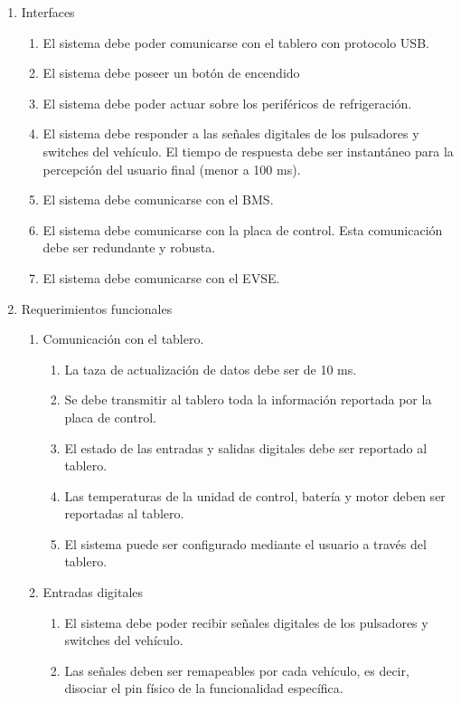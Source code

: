 \documentclass[
11pt, %
codirector, %
]{charter}
\begin{document}
\begin{enumerate}
	\item Interfaces
	      \begin{enumerate}
		      \item El sistema debe poder comunicarse con el tablero con protocolo USB.
		      \item El sistema debe poseer un botón de encendido
		      \item El sistema debe poder actuar sobre los periféricos de refrigeración.
		      \item El sistema debe responder a las señales digitales de los pulsadores y switches del vehículo. El tiempo de respuesta debe ser instantáneo para la percepción del usuario final (menor a 100 ms).
		      \item El sistema debe comunicarse con el BMS.
		      \item El sistema debe comunicarse con la placa de control. Esta comunicación debe ser redundante y robusta.
		      \item El sistema debe comunicarse con el EVSE.
	      \end{enumerate}
	\item Requerimientos funcionales
	      \begin{enumerate}
		      \item Comunicación con el tablero.
		            \begin{enumerate}
			            \item La taza de actualización de datos debe ser de 10 ms.
			            \item Se debe transmitir al tablero toda la información reportada por la placa de control.
			            \item El estado de las entradas y salidas digitales debe ser reportado al tablero.
			            \item Las temperaturas de la unidad de control, batería y motor deben ser reportadas al tablero.
			            \item El sistema puede ser configurado mediante el usuario a través del tablero.
		            \end{enumerate}
		      \item Entradas digitales
		            \begin{enumerate}
			            \item El sistema debe poder recibir señales digitales de los pulsadores y switches del vehículo.
			            \item Las señales deben ser remapeables por cada vehículo, es decir, disociar el pin físico de la funcionalidad específica.

\end{enumerate}
\end{enumerate}
\end{enumerate}
\end{document}
